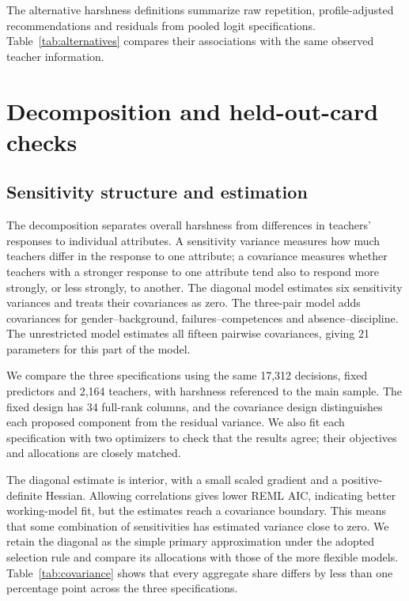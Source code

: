 The alternative harshness definitions summarize raw repetition, profile-adjusted recommendations and residuals from pooled logit specifications. Table~\ref{tab:alternatives} compares their associations with the same observed teacher information.

{\scriptsize{}}

\section{Decomposition and held-out-card checks}\label{app:prediction}
\subsection{Sensitivity structure and estimation}
The decomposition separates overall harshness from differences in teachers' responses to individual attributes. A sensitivity variance measures how much teachers differ in the response to one attribute; a covariance measures whether teachers with a stronger response to one attribute tend also to respond more strongly, or less strongly, to another. The diagonal model estimates six sensitivity variances and treats their covariances as zero. The three-pair model adds covariances for gender--background, failures--competences and absence--discipline. The unrestricted model estimates all fifteen pairwise covariances, giving 21 parameters for this part of the model.

We compare the three specifications using the same 17,312 decisions, fixed predictors and 2,164 teachers, with harshness referenced to the main sample. The fixed design has 34 full-rank columns, and the covariance design distinguishes each proposed component from the residual variance. We also fit each specification with two optimizers to check that the results agree; their objectives and allocations are closely matched.

The diagonal estimate is interior, with a small scaled gradient and a positive-definite Hessian. Allowing correlations gives lower REML AIC, indicating better working-model fit, but the estimates reach a covariance boundary. This means that some combination of sensitivities has estimated variance close to zero. We retain the diagonal as the simple primary approximation under the adopted selection rule and compare its allocations with those of the more flexible models. Table~\ref{tab:covariance} shows that every aggregate share differs by less than one percentage point across the three specifications.

